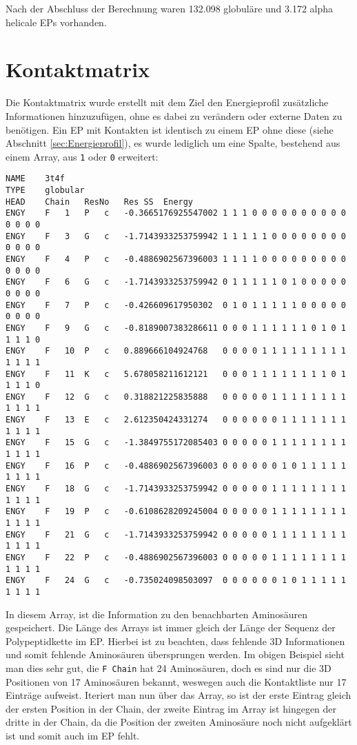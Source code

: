 Nach der Abschluss der Berechnung waren 132.098 globuläre und 3.172 alpha helicale \ac{EPs} vorhanden.

\section{Kontaktmatrix}
\label{sec:Kontaktmatrix}
Die Kontaktmatrix wurde erstellt mit dem Ziel den Energieprofil zusätzliche Informationen hinzuzufügen, ohne es dabei zu verändern oder externe Daten zu benötigen. Ein \ac{EP} mit Kontakten ist identisch zu einem \ac{EP} ohne diese (siehe Abschnitt \ref{sec:Energieprofil}), es wurde lediglich um eine Spalte, bestehend aus einem Array, aus \texttt{1} oder \texttt{0} erweitert:

\begin{lstlisting}
NAME	3t4f
TYPE	globular
HEAD	Chain	ResNo	Res	SS	Energy
ENGY	F	1	P	c	-0.3665176925547002	1 1 1 0 0 0 0 0 0 0 0 0 0 0 0 0 0
ENGY	F	3	G	c	-1.7143933253759942	1 1 1 1 1 0 0 0 0 0 0 0 0 0 0 0 0
ENGY	F	4	P	c	-0.4886902567396003	1 1 1 1 0 0 0 0 0 0 0 0 0 0 0 0 0
ENGY	F	6	G	c	-1.7143933253759942	0 1 1 1 1 1 0 1 0 0 0 0 0 0 0 0 0
ENGY	F	7	P	c	-0.426609617950302	0 1 0 1 1 1 1 1 0 0 0 0 0 0 0 0 0
ENGY	F	9	G	c	-0.8189007383286611	0 0 0 1 1 1 1 1 1 0 1 0 1 1 1 1 0
ENGY	F	10	P	c	0.889666104924768	0 0 0 0 1 1 1 1 1 1 1 1 1 1 1 1 1
ENGY	F	11	K	c	5.678058211612121	0 0 0 1 1 1 1 1 1 1 1 0 1 1 1 1 0
ENGY	F	12	G	c	0.318821225835888	0 0 0 0 0 1 1 1 1 1 1 1 1 1 1 1 1
ENGY	F	13	E	c	2.612350424331274	0 0 0 0 0 0 1 1 1 1 1 1 1 1 1 1 1
ENGY	F	15	G	c	-1.3849755172085403	0 0 0 0 0 1 1 1 1 1 1 1 1 1 1 1 1
ENGY	F	16	P	c	-0.4886902567396003	0 0 0 0 0 0 1 0 1 1 1 1 1 1 1 1 1
ENGY	F	18	G	c	-1.7143933253759942	0 0 0 0 0 1 1 1 1 1 1 1 1 1 1 1 1
ENGY	F	19	P	c	-0.6108628209245004	0 0 0 0 0 1 1 1 1 1 1 1 1 1 1 1 1
ENGY	F	21	G	c	-1.7143933253759942	0 0 0 0 0 1 1 1 1 1 1 1 1 1 1 1 1
ENGY	F	22	P	c	-0.4886902567396003	0 0 0 0 0 1 1 1 1 1 1 1 1 1 1 1 1
ENGY	F	24	G	c	-0.735024098503097	0 0 0 0 0 0 1 0 1 1 1 1 1 1 1 1 1
\end{lstlisting}

In diesem Array, ist die Information zu den benachbarten Aminosäuren gespeichert. Die Länge des Arrays ist immer gleich der Länge der Sequenz der Polypeptidkette im EP. Hierbei ist zu beachten, dass fehlende 3D Informationen und somit fehlende Aminosäuren übersprungen werden. Im obigen Beispiel sieht man dies sehr gut, die \texttt{F Chain} hat 24 Aminosäuren, doch es sind nur die 3D Positionen von 17 Aminosäuren bekannt, weswegen auch die Kontaktliste nur 17 Einträge aufweist. Iteriert man nun über das Array, so ist der erste Eintrag gleich der ersten Position in der Chain, der zweite Eintrag im Array ist hingegen der dritte in der Chain, da die Position der zweiten Aminosäure noch nicht aufgeklärt ist und somit auch im \ac{EP} fehlt.

